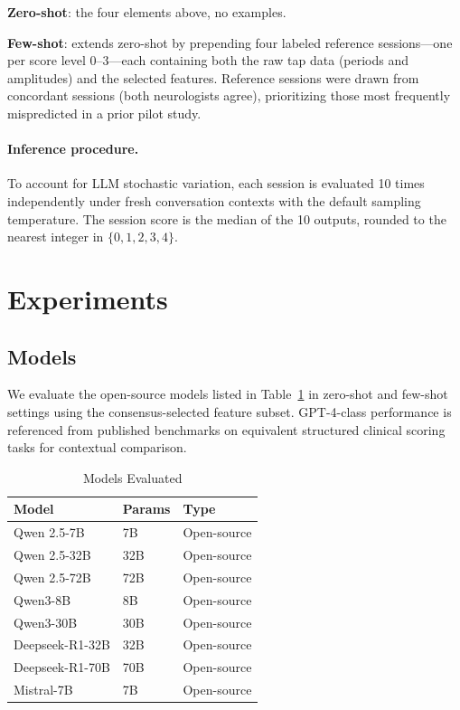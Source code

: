 \documentclass[conference]{IEEEtran}
\begin{document}
\noindent\textbf{Zero-shot}: the four elements above, no examples.

\noindent\textbf{Few-shot}: extends zero-shot by prepending four labeled reference
sessions---one per score level 0--3---each containing both the raw tap data (periods
and amplitudes) and the selected features.
Reference sessions were drawn from concordant sessions (both neurologists agree),
prioritizing those most frequently mispredicted in a prior pilot study.

\paragraph{Inference procedure.}
To account for LLM stochastic variation, each session is evaluated 10 times
independently under fresh conversation contexts with the default sampling temperature.
The session score is the median of the 10 outputs, rounded to the nearest
integer in $\{0,1,2,3,4\}$.


\section{Experiments}

\subsection{Models}
We evaluate the open-source models listed in Table~\ref{tab:models} in zero-shot and
few-shot settings using the consensus-selected feature subset.
GPT-4-class performance is referenced from published benchmarks on equivalent structured
clinical scoring tasks for contextual comparison.

\begin{table}[htbp]
    \centering
    \caption{Models Evaluated}
    \label{tab:models}
    \renewcommand{\arraystretch}{1.2}
    \begin{tabular}{lll}
        \toprule
        \textbf{Model} & \textbf{Params} & \textbf{Type} \\
        \midrule
        Qwen 2.5-7B      & 7B  & Open-source \\
        Qwen 2.5-32B     & 32B & Open-source \\
        Qwen 2.5-72B     & 72B & Open-source \\
        Qwen3-8B         & 8B  & Open-source \\
        Qwen3-30B        & 30B & Open-source \\
        Deepseek-R1-32B  & 32B & Open-source \\
        Deepseek-R1-70B  & 70B & Open-source \\
        Mistral-7B       & 7B  & Open-source \\
        \bottomrule
    \end{tabular}
\end{table}
\end{document}
